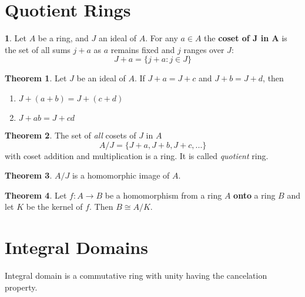 \documentclass[a4paper,12pt]{article}
\theoremstyle{definition}
\newtheorem{definition}{}[section]
\theoremstyle{axiom}
\theoremstyle{theorem}
\newtheorem{theorem}{Theorem}[section]
\theoremstyle{lemma}
\begin{document}
\section{Quotient Rings}
\begin{definition}{}
        Let $A$ be a ring, and $J$ an ideal of $A$. For any $a \in A$ the \textbf{coset of J in A} is the set of all sums $j+a$ as $a$ remains fixed and $j$ ranges over $J$:
\begin{equation*}
        J + a = \{j + a: j \in J \}
\end{equation*}
\end{definition}
\begin{theorem}{}
    Let $J$ be an ideal of $A$. If $J+a=J+c$ and $J+b=J+d$, then
    \begin{enumerate}
            \item $J+(a+b)=J+(c+d)$
            \item $J+ab=J+cd$
    \end{enumerate}
\end{theorem}
\begin{theorem}{}
    The set of \textit{all} cosets of $J$ in $A$ 
        \begin{equation*}
            A/J = \{J+a, J+b, J+c, ...\}
        \end{equation*}
        with coset addition and multiplication is a ring. It is called \textit{quotient} ring.
\end{theorem}
\begin{theorem}{}
    $A/J$ is a homomorphic image of $A$.
\end{theorem}
\begin{theorem}{}
        Let $f: A \to B$ be a homomorphism from a ring $A$ \textbf{onto} a ring $B$ and let $K$ be the kernel of $f$. Then $B \cong A/K$.
\end{theorem}
\section{Integral Domains}
Integral domain is a commutative ring with unity having the cancelation property.
\end{document}
